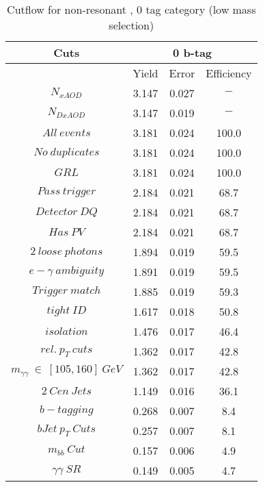 \begin{table}\footnotesize
\begin{center}
\caption{Cutflow for non-resonant \hhyybb, 0 tag category (low mass selection)}
\label{tab:cutflow-nonres-0tag-low}
\begin{tabular}{|c|c|c|c|}
\hline
Cuts& \multicolumn{3}{c|}{0 b-tag} \\ \hline
&Yield&Error&Efficiency\\ \hline
$N_{xAOD}$ & 3.147&0.027 &$-$ \\
\hline
$N_{DxAOD}$ & 3.147&0.019 &$-$ \\
\hline
$All\ events$ & 3.181&0.024 &100.0 \\
\hline
$No\ duplicates$ & 3.181&0.024 &100.0 \\
\hline
$GRL$ & 3.181&0.024 &100.0 \\
\hline
$Pass\ trigger$ & 2.184&0.021 &68.7 \\
\hline
$Detector\ DQ$ & 2.184&0.021 &68.7 \\
\hline
$Has\ PV$ & 2.184&0.021 &68.7 \\
\hline
$2\ loose\ photons$ & 1.894&0.019 &59.5 \\
\hline
$e-\gamma\ ambiguity$ & 1.891&0.019 &59.5 \\
\hline
$Trigger\ match$ & 1.885&0.019 &59.3 \\
\hline
$tight\ ID$ & 1.617&0.018 &50.8 \\
\hline
$isolation$ & 1.476&0.017 &46.4 \\
\hline
$rel.\ p_{T}\ cuts$ & 1.362&0.017 &42.8 \\
\hline
$m_{\gamma\gamma}\ \in\ [105,160]\ GeV$ & 1.362&0.017 &42.8 \\
\hline
$2\ Cen\ Jets$ & 1.149&0.016 &36.1 \\
\hline
$b-tagging$ & 0.268&0.007 & 8.4 \\
\hline
$bJet\ p_{T}\ Cuts$ & 0.257&0.007 & 8.1 \\
\hline
$m_{bb}\ Cut$ & 0.157&0.006 & 4.9 \\
\hline
$\gamma\gamma\ SR$ & 0.149&0.005 & 4.7 \\
\hline
\end{tabular}
\end{center}
\end{table}
